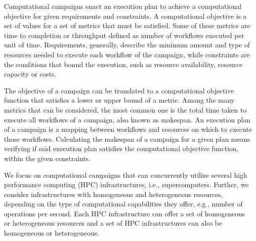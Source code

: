 
Computational campaigns enact an execution plan to achieve a computational
objective for given requirements and constraints. A computational objective is a
set of values for a set of metrics that must be satisfied. Some of these metrics
are time to completion or throughput defined as number of workflows executed per
unit of time. Requirements, generally, describe the minimum amount and type of
resources needed to execute each workflow of the campaign, while constraints are
the conditions that bound the execution, such as resource availability, resource
capacity or costs.

The objective of a campaign can be translated to a computational objective
function that satisfies a lower or upper bound of a metric. Among the many
metrics that can be considered, the most common one is the total time taken to
execute all workflows of a campaign, also known as makespan. An execution plan
of a campaign is a mapping between workflows and resources on which to execute
those workflows. Calculating the makespan of a campaign for a given plan
means verifying if said execution plan satisfies the computational objective
function, within the given constraints.


We focus on computational campaigns that can concurrently utilize several high
performance computing (HPC) infrastructures, i.e., supercomputers. Further, we
consider infrastructures with homogeneous and heterogeneous resources, depending
on the type of computational capabilities they offer, e.g., number of operations
per second. Each HPC infrastructure can offer a set of homogeneous or
heterogeneous resources and a set of HPC infrastructures can also be homogeneous
or heterogeneous.

